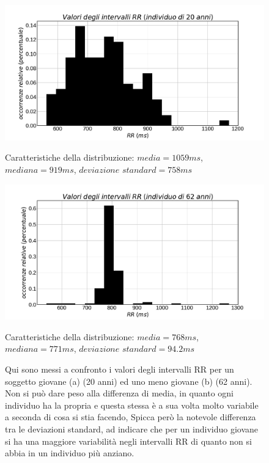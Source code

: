 \documentclass[a4paper, 12pt]{book}
\begin{document}
\begin{figure}[htbp]
\centering
\begin{minipage}[c]{.5\textwidth}
\centering%
\includegraphics[width=\textwidth]{RR-20anni.jpg}
\caption{Caratteristiche della distribuzione: $media=1059ms$, $mediana=919ms$, $deviazione$ $standard = 758ms$}
\end{minipage}%
\hspace{10mm}%
\begin{minipage}[c]{.5\textwidth}
\centering%
\includegraphics[width=\textwidth]{RR-62anni.jpg}
\caption{Caratteristiche della distribuzione: $media=768ms$, $mediana=771ms$, $deviazione$ $standard = 94.2ms$}
\end{minipage}
\caption{Qui sono messi a confronto i valori degli intervalli RR per un soggetto giovane (a) (20 anni) ed uno meno giovane (b) (62 anni).
    Non si può dare peso alla differenza di media, in quanto ogni individuo ha la propria e questa stessa è a sua volta molto variabile a seconda di cosa si stia facendo, Spicca però la notevole differenza tra le deviazioni standard, ad indicare che per un individuo giovane si ha una maggiore variabilità negli intervalli RR di quanto non si abbia in un individuo più anziano.
}
\label{fig:RR_y_vs_o}
\end{figure}
\end{document}
